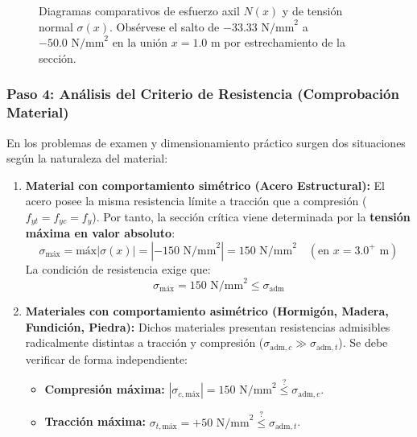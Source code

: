 \begin{figure}[H]
{%
    }
    \caption{Diagramas comparativos de esfuerzo axil $N(x)$ y de tensión normal $\sigma(x)$. Obsérvese el salto de $-33.33\text{ N/mm}^2$ a $-50.0\text{ N/mm}^2$ en la unión $x = 1.0\text{ m}$ por estrechamiento de la sección.}
    \label{fig:diagramas_axil_tension_p10}
\end{figure}

\subsubsection*{Paso 4: Análisis del Criterio de Resistencia (Comprobación Material)}
En los problemas de examen y dimensionamiento práctico surgen dos situaciones según la naturaleza del material:
\begin{enumerate}
    \item \textbf{Material con comportamiento simétrico (Acero Estructural):}
          El acero posee la misma resistencia límite a tracción que a compresión ($f_{yt} = f_{yc} = f_y$). Por tanto, la sección crítica viene determinada por la \textbf{tensión máxima en valor absoluto}:
          \begin{equation}
              \sigma_{\text{máx}} = \text{máx} |\sigma(x)| = |-150\text{ N/mm}^2| = 150\text{ N/mm}^2 \quad (\text{en } x = 3.0^+\text{ m})
          \end{equation}
          La condición de resistencia exige que:
          \begin{equation}
              \sigma_{\text{máx}} = 150\text{ N/mm}^2 \le \sigma_{\text{adm}}
          \end{equation}

    \item \textbf{Materiales con comportamiento asimétrico (Hormigón, Madera, Fundición, Piedra):}
          Dichos materiales presentan resistencias admisibles radicalmente distintas a tracción y compresión ($\sigma_{\text{adm},c} \gg \sigma_{\text{adm},t}$). Se debe verificar de forma independiente:
          \begin{itemize}
              \item \textbf{Compresión máxima:} $|\sigma_{c,\text{máx}}| = 150\text{ N/mm}^2 \stackrel{?}{\le} \sigma_{\text{adm},c}$.
              \item \textbf{Tracción máxima:} $\sigma_{t,\text{máx}} = +50\text{ N/mm}^2 \stackrel{?}{\le} \sigma_{\text{adm},t}$.
          \end{itemize}
\end{enumerate}

